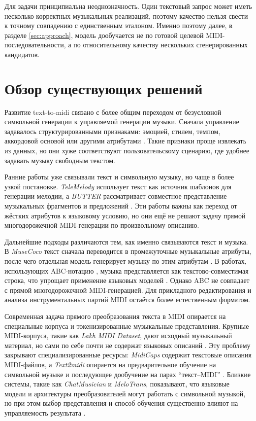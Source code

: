 \documentclass[a4paper,12pt]{extarticle}
\begin{document}
Для задачи принципиальна неоднозначность. Один текстовый запрос может иметь
несколько корректных музыкальных реализаций, поэтому качество нельзя свести к
точному совпадению с единственным эталоном. Именно поэтому далее, в разделе
\ref{sec:approach}, модель дообучается не по готовой целевой
MIDI-последовательности, а по относительному качеству нескольких
сгенерированных кандидатов.

\section{Обзор существующих решений}
\label{sec:related}

Развитие text-to-midi связано с более общим переходом от безусловной
символьной генерации к управляемой генерации музыки. Сначала управление
задавалось структурированными признаками: эмоцией, стилем, темпом,
аккордовой основой или другими атрибутами
\cite{sulun2022emotion,ju2022telemelody}. Такие признаки проще извлекать из
данных, но они хуже соответствуют пользовательскому сценарию, где удобнее
задавать музыку свободным текстом.

Ранние работы уже связывали текст и символьную музыку, но чаще в более
узкой постановке. \textit{TeleMelody} использует текст как источник
шаблонов для генерации мелодии, а \textit{BUTTER} рассматривает совместное
представление музыкальных фрагментов и предложений
\cite{ju2022telemelody,zhang2020butter}. Эти работы важны как переход от
жёстких атрибутов к языковому условию, но они ещё не решают задачу прямой
многодорожечной MIDI-генерации по произвольному описанию.

Дальнейшие подходы различаются тем, как именно связываются текст и музыка.
В \textit{MuseCoco} текст сначала переводится в промежуточные музыкальные
атрибуты, после чего отдельная модель генерирует музыку по этим атрибутам
\cite{lu2023musecoco}. В работах, использующих ABC-нотацию \cite{abcnotation2026}, музыка
представляется как текстово-совместимая строка, что упрощает применение
языковых моделей \cite{wu2022texttomusic,chatmusician2024}. Однако ABC
не совпадает с прямой многодорожечной MIDI-генерацией. Для прикладного
редактирования и анализа инструментальных партий MIDI остаётся более
естественным форматом.

Современная задача прямого преобразования текста в MIDI опирается на
специальные корпуса и токенизированные музыкальные представления. Крупные
MIDI-корпуса, такие как \textit{Lakh MIDI Dataset}, дают исходный
музыкальный материал, но сами по себе почти не содержат языковых описаний
\cite{raffel2016lmd}. Эту проблему закрывают специализированные ресурсы:
\textit{MidiCaps} содержит текстовые описания MIDI-файлов, а
\textit{Text2midi} опирается на предварительное обучение на символьной
музыке и последующее дообучение на парах ``текст--MIDI''
\cite{midicaps2024,text2midi2025}. Близкие системы, такие как
\textit{ChatMusician} и \textit{MeloTrans}, показывают, что языковые модели
и архитектуры преобразователей могут работать с символьной музыкой, но при
этом выбор представления и способ обучения существенно влияют на
управляемость результата \cite{chatmusician2024,melotrans2024}.
\end{document}
